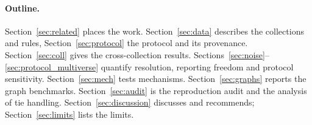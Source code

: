 \paragraph{Outline.} Section~\ref{sec:related} places the work. Section~\ref{sec:data} describes the collections and rules, Section~\ref{sec:protocol} the protocol and its provenance. Section~\ref{sec:coll} gives the cross-collection results. Sections~\ref{sec:noise}--\ref{sec:protocol_multiverse} quantify resolution, reporting freedom and protocol sensitivity. Section~\ref{sec:mech} tests mechanisms. Section~\ref{sec:graphs} reports the graph benchmarks. Section~\ref{sec:audit} is the reproduction audit and the analysis of tie handling. Section~\ref{sec:discussion} discusses and recommends; Section~\ref{sec:limits} lists the limits.
